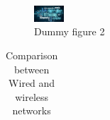\begin{figure}[ht]
\begin{center}
\includegraphics[width=0.1\textwidth]{figures/samples/it.png}
\caption{Dummy figure 2}
\label{fig6}
\end{center}
\end{figure}

\begin{table}[ht]
\caption{Comparison between Wired and wireless networks}
\begin{center}
{\small
\begin{tabular}{p{}p{}p{}}


\end{tabular}}
\end{center}
\end{table}
